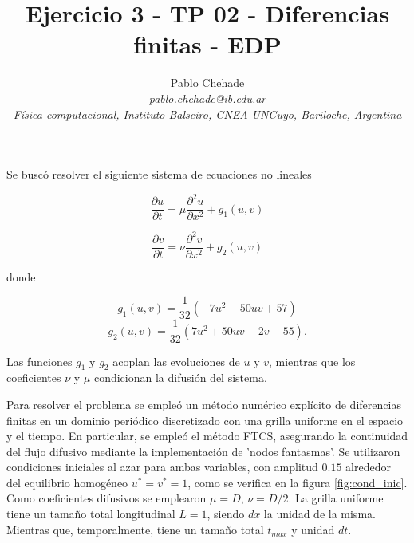 \documentclass[aps,prb,twocolumn,superscriptaddress,floatfix,longbibliography]{revtex4-2}
\newcounter{para}
\begin{document}
\newcommand{\mytitle}{Ejercicio 3 - TP 02 - Diferencias finitas - EDP }

\title{\mytitle}

\author{Pablo Chehade \\
    \small \textit{pablo.chehade@ib.edu.ar} \\
    \small \textit{Física computacional, Instituto Balseiro, CNEA-UNCuyo, Bariloche, Argentina} \\}


\maketitle

Se buscó resolver el siguiente sistema de ecuaciones no lineales

\begin{equation}
\frac{\partial u}{\partial t} = \mu \frac{\partial^2 u}{\partial x^2} + g_1(u,v)
\label{eq:edp_u}
\end{equation}

\begin{equation}
\frac{\partial v}{\partial t} = \nu \frac{\partial^2 v}{\partial x^2} + g_2(u,v)
\label{eq:edp_v}
\end{equation}

donde

\[ g_1(u,v) = \frac{1}{32} (-7 u^2 - 50 u v + 57) \]
\[ g_2(u,v) = \frac{1}{32} (7 u^2 + 50 u v  - 2 v - 55).\]

Las funciones $g_1$ y $g_2$ acoplan las evoluciones de $u$ y $v$, mientras que los coeficientes $\nu$ y $\mu$ condicionan la difusión del sistema.

Para resolver el problema se empleó un método numérico explícito de diferencias finitas en un dominio periódico discretizado con una grilla uniforme en el espacio y el tiempo. En particular, se empleó el método FTCS, asegurando la continuidad del flujo difusivo mediante la implementación de 'nodos fantasmas'. Se utilizaron condiciones iniciales al azar para ambas variables, con amplitud $0.15$ alrededor del equilibrio homogéneo $u^* = v^* = 1$, como se verifica en la figura \ref{fig:cond_inic}. Como coeficientes difusivos se emplearon $\mu = D$, $\nu = D/2$. La grilla uniforme tiene un tamaño total longitudinal $L = 1$, siendo $dx$ la unidad de la misma. Mientras que, temporalmente, tiene un tamaño total $t_{max}$ y unidad $dt$.
\end{document}
